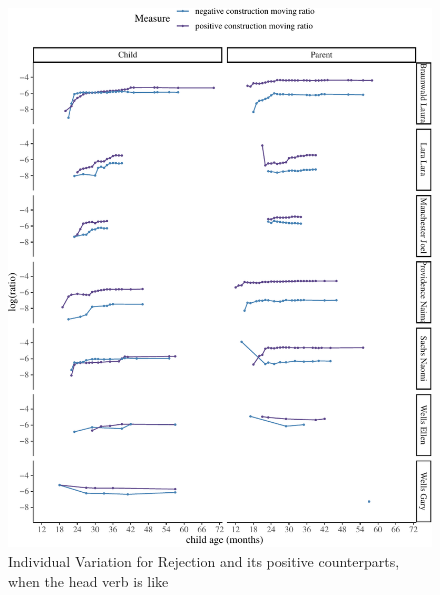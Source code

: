 \documentclass[
  english,
  man,floatsintext]{apa6}
\begin{document}
\begin{figure}[H]

{\centering \includegraphics{neg_construction_article_files/figure-latex/individualemotionlike-1} 

}

\caption{Individual Variation for  Rejection and its positive counterparts, when the head verb is like}\label{fig:individualemotionlike}
\end{figure}
\end{document}
